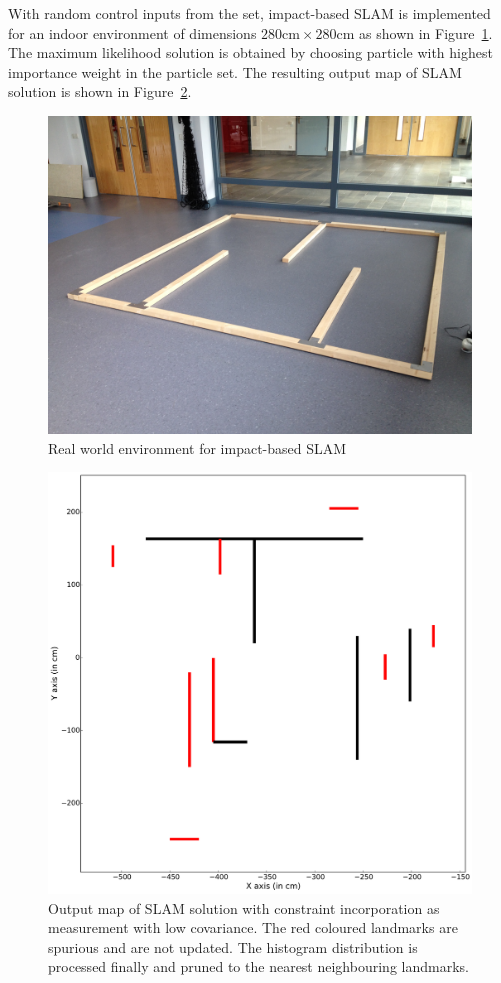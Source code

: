 With random control inputs from the set, impact-based SLAM is implemented for an indoor environment of dimensions $280\text{cm} \times 280\text{cm}$ as shown in Figure~\ref{maze}. The maximum likelihood solution is obtained by choosing particle with highest importance weight in the particle set. The resulting output map of SLAM solution is shown in Figure~\ref{single_lcmap}.

\begin{figure}
\centering
\includegraphics[scale=0.1]{./images/maze.jpg}
\caption[Real world environment for impact-based SLAM]{Real world environment for impact-based SLAM}
\label{maze}
\end{figure}

\begin{figure}
\centering
\includegraphics[scale=0.25]{./images/single_lcmap}
\caption{Output map of SLAM solution with constraint incorporation as measurement with low covariance. The red coloured landmarks are spurious and are not updated. The histogram distribution is processed finally and pruned to the nearest neighbouring landmarks.}
\label{single_lcmap}
\end{figure}

